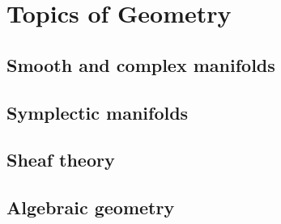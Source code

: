 \part{Topics of Geometry}

\chapter{Smooth and complex manifolds}

\chapter{Symplectic manifolds}

\chapter{Sheaf theory}

\chapter{Algebraic geometry}


